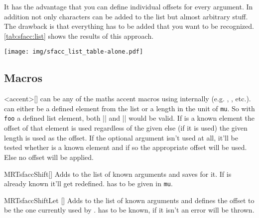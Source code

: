 It has the advantage that you can define individual offsets for every argument.
In addition not only characters can be added to the list but almost arbitrary
stuff. The drawback is that everything has to be added that you want to be
recognized.
\autoref{tab:sfacc:list} shows the results of this approach.

\begin{table}%
  \centering
  \texttt{[image: img/sfacc\_list\_table-alone.pdf]}
  \caption
    {%
      Comparison of shifted accents against original placement with the use of
      the  variant.%
      \label{tab:sfacc:list}%
    }%
\end{table}%

\subsection{Macros}
\begin{describemacro}{<accent>}[]%
   can be any of the maths accent macros using 
  internally (e.g. , , etc.).\\
   can either be a defined element from the list or a length in the
  unit of \texttt{mu}. So with \texttt{foo} a defined list element, both
  \bverb|| and \bverb|| would be valid. If
   is a known element the offset of that element is used regardless of
  the given  else (if it is used) the given length is used as the
  offset. If the optional argument isn't used at all, it'll be tested whether
   is a known element and if so the appropriate offset will be used.
  Else no offset will be applied.
\end{describemacro}%

\begin{describemacro}{MRTsfaccShift}[]%
  Adds  to the list of known arguments and saves  for
  it. If  is already known it'll get redefined.  has
  to be given in \texttt{mu}.
\end{describemacro}%

\begin{describemacro}{MRTsfaccShiftLet}%
  []
  Adds  to the list of known arguments and defines the
  offset to be the one currently used by .
   has to be known, if it isn't an error will be thrown.
\end{describemacro}%

